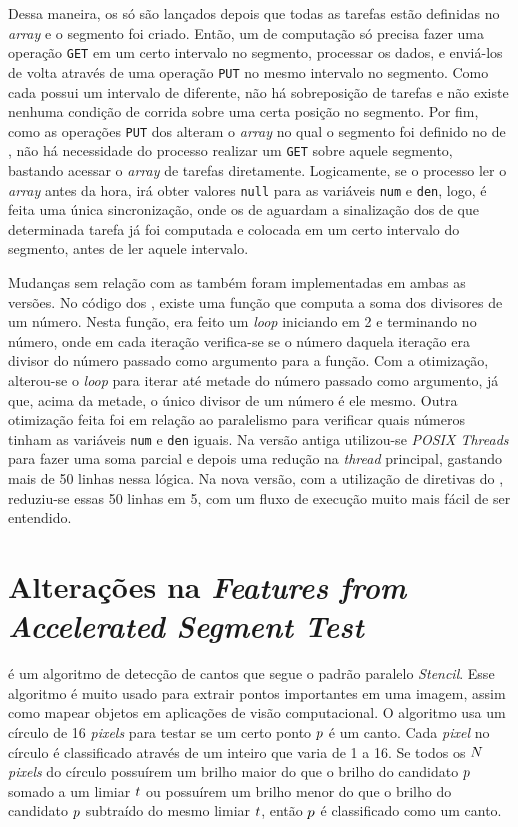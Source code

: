 Dessa maneira, os \CCs só são lançados depois que todas as tarefas estão definidas no \textit{array} e o segmento foi criado. Então, um \cluster de computação só precisa fazer uma operação \texttt{GET} em um certo intervalo no segmento, processar os dados, e enviá-los de volta através de uma operação \texttt{PUT} no mesmo intervalo no segmento. Como cada \CC possui um intervalo de \offsets diferente, não há sobreposição de tarefas e não existe nenhuma condição de corrida sobre uma certa posição no segmento. Por fim, como as operações \texttt{PUT} dos \CCs alteram o \textit{array} no qual o segmento foi definido no \cluster de \IO, não há necessidade do processo \master realizar um \texttt{GET} sobre aquele segmento, bastando acessar o \textit{array} de tarefas diretamente. Logicamente, se o processo \master ler o \textit{array} antes da hora, irá obter valores \texttt{null} para as variáveis \texttt{num} e \texttt{den}, logo, é feita uma única sincronização, onde os \clusters de \IO aguardam a sinalização dos \CCs de que determinada tarefa já foi computada e colocada em um certo intervalo do segmento, antes de ler aquele intervalo.

Mudanças sem relação com as \APIs também foram implementadas em ambas as versões. No código dos \slaves, existe uma função que computa a soma dos divisores de um número. Nesta função, era feito um \textit{loop} iniciando em 2 e terminando no número, onde em cada iteração verifica-se se o número daquela iteração era divisor do número passado como argumento para a função. Com a otimização, alterou-se o \textit{loop} para iterar até metade do número passado como argumento, já que, acima da metade, o único divisor de um número é ele mesmo. Outra otimização feita foi em relação ao paralelismo para verificar quais números tinham as variáveis \texttt{num} e \texttt{den} iguais. Na versão antiga utilizou-se \textit{POSIX Threads} para fazer uma soma parcial e depois uma redução na \textit{thread} principal, gastando mais de 50 linhas nessa lógica. Na nova versão, com a utilização de diretivas do \OpenMP, reduziu-se essas 50 linhas em 5, com um fluxo de execução muito mais fácil de ser entendido.

\section{Alterações na \textit{Features from Accelerated Segment Test}}
\label{sec:alteracoesfast}

\textit{\FAST} é um algoritmo de detecção de cantos que segue o padrão paralelo \textit{Stencil}. Esse algoritmo é muito usado para extrair pontos importantes em uma imagem, assim como mapear objetos em aplicações de visão computacional. O algoritmo usa um círculo de 16 \textit{pixels} para testar se um certo ponto $\mathnormal{p}$ é um canto. Cada \textit{pixel} no círculo é classificado através de um inteiro que varia de 1 a 16. Se todos os $\mathnormal{N}$ \textit{pixels} do círculo possuírem um brilho maior do que o brilho do candidato $\mathnormal{p}$ somado a um limiar $\mathnormal{t}$ ou possuírem um brilho menor do que o brilho do candidato $\mathnormal{p}$ subtraído do mesmo limiar $\mathnormal{t}$, então $\mathnormal{p}$ é classificado como um canto.


